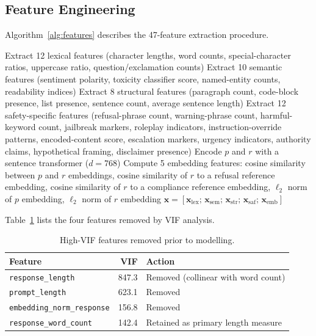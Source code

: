\documentclass[10pt,letterpaper]{article}
\begin{document}
\subsection{Feature Engineering}
\label{sec:features}

Algorithm~\ref{alg:features} describes the 47-feature extraction procedure.

\begin{algorithm}[ht]
\caption{Safety Feature Extraction}
\label{alg:features}
\BlankLine
Extract 12 lexical features (character lengths, word counts, special-character
ratios, uppercase ratio, question/exclamation counts)\;
Extract 10 semantic features (sentiment polarity, toxicity classifier score,
named-entity counts, readability indices)\;
Extract 8 structural features (paragraph count, code-block presence, list
presence, sentence count, average sentence length)\;
Extract 12 safety-specific features (refusal-phrase count, warning-phrase
count, harmful-keyword count, jailbreak markers, roleplay indicators,
instruction-override patterns, encoded-content score, escalation markers,
urgency indicators, authority claims, hypothetical framing, disclaimer
presence)\;
Encode $p$ and $r$ with a sentence transformer ($d=768$)\;
Compute 5 embedding features:
  cosine similarity between $p$ and $r$ embeddings,
  cosine similarity of $r$ to a refusal reference embedding,
  cosine similarity of $r$ to a compliance reference embedding,
  $\ell_2$ norm of $p$ embedding,
  $\ell_2$ norm of $r$ embedding\;
\Return $\mathbf{x} = [\mathbf{x}_\mathrm{lex};\, \mathbf{x}_\mathrm{sem};\,
  \mathbf{x}_\mathrm{str};\, \mathbf{x}_\mathrm{saf};\, \mathbf{x}_\mathrm{emb}]$\;
\end{algorithm}

Table~\ref{tab:vif} lists the four features removed by VIF analysis.

\begin{table}[ht]
\centering
\caption{High-VIF features removed prior to modelling.}
\label{tab:vif}
\begin{tabular}{lrl}
\toprule
Feature & VIF & Action \\
\midrule
\texttt{response\_length} & 847.3 & Removed (collinear with word count) \\
\texttt{prompt\_length} & 623.1 & Removed \\
\texttt{embedding\_norm\_response} & 156.8 & Removed \\
\texttt{response\_word\_count} & 142.4 & Retained as primary length measure \\
\bottomrule
\end{tabular}
\end{table}
\end{document}

